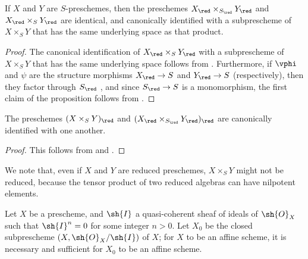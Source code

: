 \begin{proposition}[5.1.7]
\label{I.5.1.7}
If $X$ and $Y$ are $S$-preschemes, then the preschemes $X_\red\times_{S_\red}Y_\red$ and $X_\red\times_S Y_\red$ are identical, and canonically identified with a subprescheme of $X\times_S Y$ that has the same underlying space as that product.
\end{proposition}

\begin{proof}
The canonical identification of $X_\red\times_S Y_\red$ with a subprescheme of $X\times_S Y$ that has the same underlying space follows from .
Furthermore, if $\vphi$ and $\psi$ are the structure morphisms $X_\red\to S$ and $Y_\red\to S$ (respectively), then they factor through $S_\red$ , and since $S_\red\to S$ is a monomorphism, the first claim of the proposition follows from .
\end{proof}

\begin{corollary}[5.1.8]
\label{I.5.1.8}
The preschemes $(X\times_S Y)_\red$ and $(X_\red\times_{S_\red}Y_\red)_\red$ are canonically identified with one another.
\end{corollary}

\begin{proof}
This follows from  and .
\end{proof}

We note that, even if $X$ and $Y$ are reduced preschemes, $X\times_S Y$ might not be reduced, because the tensor product of two reduced algebras can have nilpotent elements.

\begin{proposition}[5.1.9]
\label{I.5.1.9}
Let $X$ be a prescheme, and $\sh{I}$ a quasi-coherent sheaf of ideals of $\sh{O}_X$ such that $\sh{I}^n=0$ for some integer $n>0$.
Let $X_0$ be the closed subprescheme $(X,\sh{O}_X/\sh{I})$ of $X$;
for $X$ to be an affine scheme, it is necessary and sufficient for $X_0$ to be an affine scheme.
\end{proposition}

